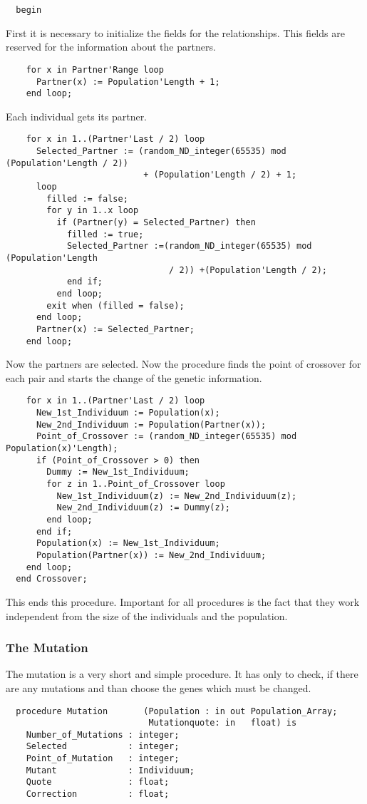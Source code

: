 \begin{enumerate}
\begin{verbatim}
  begin
\end{verbatim}
First it is necessary to initialize the fields for the relationships. This fields are
reserved for the information about the partners.
\begin{verbatim}
    for x in Partner'Range loop
      Partner(x) := Population'Length + 1;
    end loop;
\end{verbatim}
Each individual gets its partner.
\begin{verbatim}
    for x in 1..(Partner'Last / 2) loop
      Selected_Partner := (random_ND_integer(65535) mod (Population'Length / 2))
                           + (Population'Length / 2) + 1;
      loop
        filled := false;
        for y in 1..x loop
          if (Partner(y) = Selected_Partner) then
            filled := true;
            Selected_Partner :=(random_ND_integer(65535) mod (Population'Length
                                / 2)) +(Population'Length / 2);
            end if;
          end loop;
        exit when (filled = false);
      end loop;
      Partner(x) := Selected_Partner;
    end loop;
\end{verbatim}
Now the partners are selected. Now the procedure finds the point of crossover
for each pair and starts the change of the genetic information.
\begin{verbatim}
    for x in 1..(Partner'Last / 2) loop
      New_1st_Individuum := Population(x);
      New_2nd_Individuum := Population(Partner(x));
      Point_of_Crossover := (random_ND_integer(65535) mod Population(x)'Length);
      if (Point_of_Crossover > 0) then
        Dummy := New_1st_Individuum;
        for z in 1..Point_of_Crossover loop
          New_1st_Individuum(z) := New_2nd_Individuum(z);
          New_2nd_Individuum(z) := Dummy(z);
        end loop;
      end if;
      Population(x) := New_1st_Individuum;
      Population(Partner(x)) := New_2nd_Individuum;
    end loop;
  end Crossover;
\end{verbatim}
This ends this procedure. Important for all procedures is the fact that they
work independent from the size of the individuals and the population.
\subsubsection{The Mutation}
The mutation is a very short and simple procedure. It has only to check, if there are
any mutations and than choose the genes which must be changed.
\begin{verbatim}
  procedure Mutation       (Population : in out Population_Array;
                            Mutationquote: in   float) is
    Number_of_Mutations : integer;
    Selected            : integer;
    Point_of_Mutation   : integer;
    Mutant              : Individuum;
    Quote               : float;
    Correction          : float;


\end{verbatim}
\end{enumerate}
